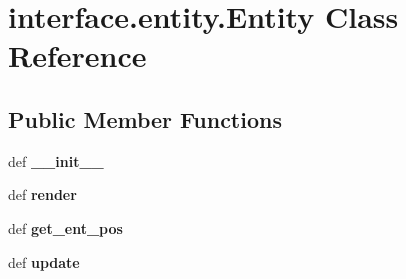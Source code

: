 \hypertarget{classinterface_1_1entity_1_1_entity}{\section{interface.\-entity.\-Entity \-Class \-Reference}
\label{classinterface_1_1entity_1_1_entity}
}
\subsection*{\-Public \-Member \-Functions}
\begin{DoxyCompactItemize}
\item 
\hypertarget{classinterface_1_1entity_1_1_entity_a2d0ffe60ca9b28c2e3f60676d1571798}{def {\bfseries \-\_\-\-\_\-init\-\_\-\-\_\-}}\label{classinterface_1_1entity_1_1_entity_a2d0ffe60ca9b28c2e3f60676d1571798}

\item 
\hypertarget{classinterface_1_1entity_1_1_entity_a3711185e5f592a7a4a8ba43f68ea14e8}{def {\bfseries render}}\label{classinterface_1_1entity_1_1_entity_a3711185e5f592a7a4a8ba43f68ea14e8}

\item 
\hypertarget{classinterface_1_1entity_1_1_entity_acfef12dffdda93eae47da3fab5a3801d}{def {\bfseries get\-\_\-ent\-\_\-pos}}\label{classinterface_1_1entity_1_1_entity_acfef12dffdda93eae47da3fab5a3801d}

\item 
\hypertarget{classinterface_1_1entity_1_1_entity_a29f5969b06f3869feee65999f3af780d}{def {\bfseries update}}\label{classinterface_1_1entity_1_1_entity_a29f5969b06f3869feee65999f3af780d}

\end{DoxyCompactItemize}
